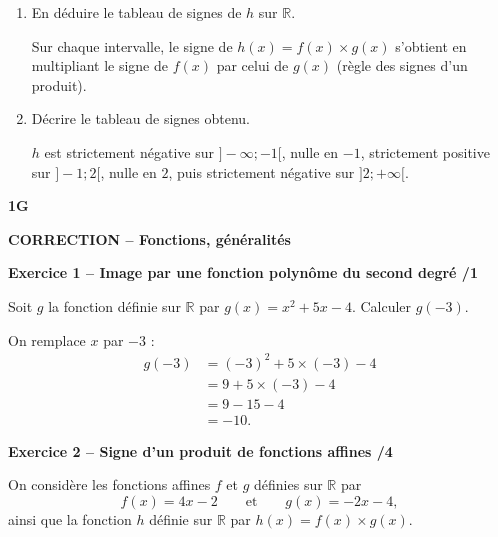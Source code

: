 \documentclass[10pt,a4paper]{article}
\renewcommand{\niveau}{1G}
\renewcommand{\chapitre}{Fonctions, généralités}
\renewcommand{\interroversion}[1]{
    \noindent\textbf{\niveau}

    \vspace{-0.5cm}
    \begin{center}
        \textbf{\large CORRECTION -- \chapitre}
    \end{center}

    \vspace{0.1cm}
}
\begin{document}
\begin{enumerate}
\item En déduire le tableau de signes de \(h\) sur \(\mathbb{R}\).

Sur chaque intervalle, le signe de \(h(x)=f(x)\times g(x)\) s'obtient en multipliant le signe de \(f(x)\) par celui de \(g(x)\) (règle des signes d'un produit).

\begin{center}
\end{center}

\item Décrire le tableau de signes obtenu.

\(h\) est strictement négative sur \(]-\infty;-1[\), nulle en \(-1\), strictement positive sur \(]-1;2[\), nulle en \(2\), puis strictement négative sur \(]2;+\infty[\).
\end{enumerate}

\newpage


\interroversion{C}

\textbf{Exercice 1 -- Image par une fonction polynôme du second degré \hfill /1}

Soit \(g\) la fonction définie sur \(\mathbb{R}\) par \(g(x)=x^2+5x-4\). Calculer \(g(-3)\).

On remplace \(x\) par \(-3\) :
\[
\begin{aligned}
g(-3) &= (-3)^2+5\times(-3)-4\\
      &= 9+5\times(-3)-4\\
      &= 9-15-4\\
      &= -10.
\end{aligned}
\]

\textbf{Exercice 2 -- Signe d'un produit de fonctions affines \hfill /4}

On considère les fonctions affines \(f\) et \(g\) définies sur \(\mathbb{R}\) par
\[
f(x)=4x-2 \qquad\text{et}\qquad g(x)=-2x-4,
\]
ainsi que la fonction \(h\) définie sur \(\mathbb{R}\) par \(h(x)=f(x)\times g(x)\).
\end{document}
